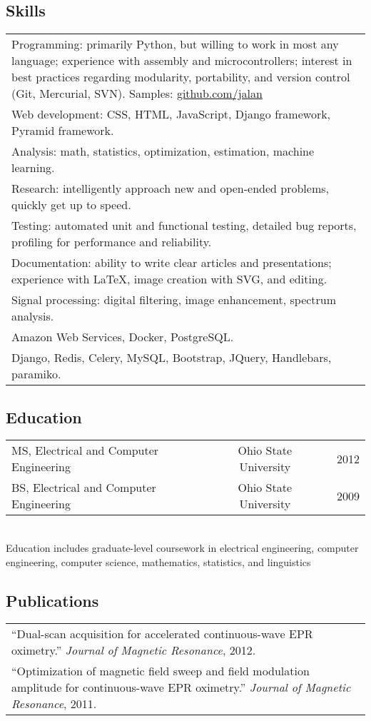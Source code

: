 \documentclass[12pt]{report}
\renewcommand{\bullet}{$\vcenter{\hbox{~\huge$\cdot$~}}$}
\begin{document}
\subsection*{Skills}
\begin{tabularx}{\textwidth}{ @{\bullet} X @{} }
Programming: primarily Python, but willing to work in most any language; experience with assembly and microcontrollers; interest in best practices regarding modularity, portability, and version control (Git, Mercurial, SVN). Samples: \href{http://github.com/jalan}{github.com/jalan} \\
Web development: CSS, HTML, JavaScript, Django framework, Pyramid framework. \\
Analysis: math, statistics, optimization, estimation, machine learning. \\
Research: intelligently approach new and open-ended problems, quickly get up to speed. \\
Testing: automated unit and functional testing, detailed bug reports, profiling for performance and reliability. \\
Documentation: ability to write clear articles and presentations; experience with \LaTeX, image creation with SVG, and editing. \\
Signal processing: digital filtering, image enhancement, spectrum analysis. \\
Amazon Web Services, Docker, PostgreSQL. \\
Django, Redis, Celery, MySQL, Bootstrap, JQuery, Handlebars, paramiko. \\
\end{tabularx}

\subsection*{Education}
\begin{tabularx}{\textwidth}{ @{\bullet} l X c X r @{} }
MS, Electrical and Computer Engineering && Ohio State University && 2012 \\
BS, Electrical and Computer Engineering && Ohio State University && 2009 \\
\end{tabularx}
\newline \\
Education includes graduate-level coursework in electrical engineering, computer engineering, computer science, mathematics, statistics, and linguistics

\subsection*{Publications}
\begin{tabularx}{\textwidth}{ @{\bullet} X @{} }
``Dual-scan acquisition for accelerated continuous-wave EPR oximetry.'' {\it Journal of Magnetic Resonance}, 2012. \\
``Optimization of magnetic field sweep and field modulation amplitude for continuous-wave EPR oximetry.'' {\it Journal of Magnetic Resonance}, 2011. \\
\end{tabularx}
\end{document}

